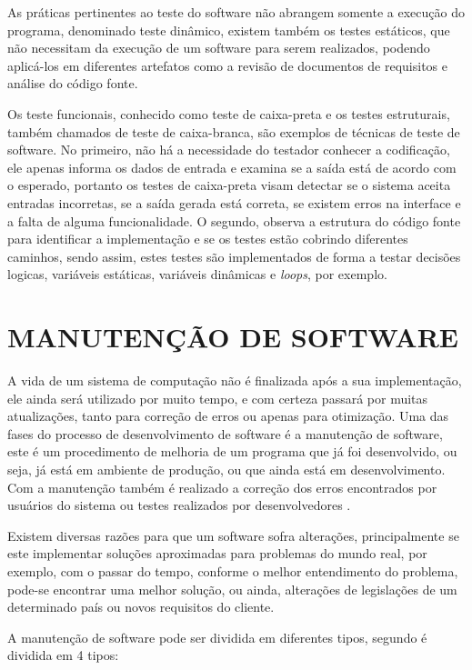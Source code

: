As práticas pertinentes ao teste do software não abrangem somente a execução do programa, denominado teste dinâmico, existem também os testes estáticos, que não necessitam da execução de um software para serem realizados, podendo aplicá-los em diferentes artefatos como a revisão de documentos de requisitos e análise do código fonte.\cite{Pedro}

Os teste funcionais, conhecido como teste de caixa-preta e os testes estruturais, também chamados de teste de caixa-branca, são exemplos de técnicas de teste de software. No primeiro, não há a necessidade do testador conhecer a codificação, ele apenas informa os dados de entrada e examina se a saída está de acordo com o esperado, portanto os testes de caixa-preta visam detectar se o sistema aceita entradas incorretas, se a saída gerada está correta, se existem erros na interface e a falta de alguma funcionalidade. O segundo, observa a estrutura do código fonte para identificar a implementação e se os testes estão cobrindo diferentes caminhos, sendo assim, estes testes são implementados de forma a testar decisões logicas, variáveis estáticas, variáveis dinâmicas e \textit{loops}, por exemplo.\cite{Pedro}


\section{MANUTENÇÃO DE SOFTWARE}
\label{sec:manutencaoDeSoftware}

A vida de um sistema de computação não é finalizada após a sua implementação, ele ainda será utilizado por muito tempo, e com certeza passará por muitas atualizações, tanto para correção de erros ou apenas para otimização. Uma das fases do processo de desenvolvimento de software é a manutenção de software, este é um procedimento de melhoria de um programa que já foi desenvolvido, ou seja, já está em ambiente de produção, ou que ainda está em desenvolvimento. Com a manutenção também é realizado a correção dos erros encontrados por usuários do sistema ou testes realizados por desenvolvedores \cite{rodrigoSpinola2011}.

Existem diversas razões para que um software sofra alterações, principalmente se este implementar soluções aproximadas para problemas do mundo real, por exemplo, com o passar do tempo, conforme o melhor entendimento do problema, pode-se encontrar uma melhor solução, ou ainda, alterações de legislações de um determinado país ou novos requisitos do cliente.

A manutenção de software pode ser dividida em diferentes tipos, segundo \cite{Pressman2005} é dividida em 4 tipos:


